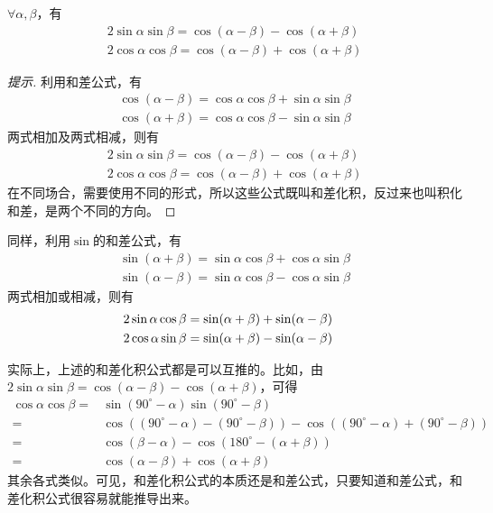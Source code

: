 \begin{theorem}
  $\forall \alpha, \beta$，有
  \begin{align*}
    2\sin\alpha\sin\beta = \cos(\alpha-\beta) - \cos(\alpha+\beta)\\
    2\cos\alpha\cos\beta = \cos(\alpha-\beta) + \cos(\alpha+\beta)
  \end{align*}
\end{theorem}
\begin{proof}[提示]
  利用和差公式，有
  \begin{align*}
    \cos(\alpha-\beta) = \cos\alpha\cos\beta + \sin\alpha\sin\beta \\
    \cos(\alpha+\beta) = \cos\alpha\cos\beta - \sin\alpha\sin\beta
  \end{align*}
  两式相加及两式相减，则有
  \begin{align*}
    2\sin\alpha\sin\beta = \cos(\alpha-\beta) - \cos(\alpha+\beta) \\
    2\cos\alpha\cos\beta = \cos(\alpha-\beta) + \cos(\alpha+\beta)
  \end{align*}
  在不同场合，需要使用不同的形式，所以这些公式既叫和差化积，反过来也叫积化和差，是两个不同的方向。
\end{proof}

\begin{example}
  同样，利用$\sin$的和差公式，有
  \begin{align*}
    \sin(\alpha+\beta) = \sin\alpha\cos\beta + \cos\alpha\sin\beta \\
    \sin(\alpha-\beta) = \sin\alpha\cos\beta - \cos\alpha\sin\beta
  \end{align*}
  两式相加或相减，则有
  \begin{align*}
    2 \sin\alpha\cos\beta = \sin(\alpha + \beta) + \sin(\alpha - \beta)\\
    2 \cos\alpha\sin\beta = \sin(\alpha + \beta) - \sin(\alpha - \beta)&\qedhere
  \end{align*}
\end{example}

\begin{example}[和差化积公式互推]
  实际上，上述的和差化积公式都是可以互推的。比如，由$2\sin\alpha\sin\beta = \cos(\alpha-\beta) - \cos(\alpha+\beta)$，可得
  \begin{align*}
    \cos\alpha\cos\beta ={} & \sin(90^\circ - \alpha)\sin(90^\circ - \beta) \\
                        ={} & \cos\left( (90^\circ - \alpha) - (90^\circ - \beta) \right) - 
                              \cos\left( (90^\circ - \alpha) + (90^\circ - \beta) \right)\\
                        ={} & \cos(\beta - \alpha) - \cos\left( 180^\circ - (\alpha + \beta) \right) \\
                        ={} & \cos(\alpha - \beta) + \cos(\alpha + \beta)
  \end{align*}
  其余各式类似。可见，和差化积公式的本质还是和差公式，只要知道和差公式，和差化积公式很容易就能推导出来。
\end{example}

